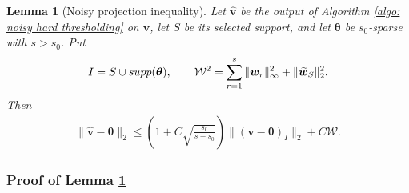 \documentclass[letterpaper,12pt]{article}
\numberwithin{equation}{section}
\theoremstyle{plain}
\numberwithin{Theorem}{section}
\numberwithin{proposition}{section}
\newtheorem{Lemma}{Lemma}
\numberwithin{Lemma}{section}
{
	\theoremstyle{definition}
	\newtheorem{Definition}{Definition}
	\newtheorem{example}{Example}
	\numberwithin{example}{section}
	\newtheorem{fact}{Fact}
	\numberwithin{fact}{section}
	\newtheorem{remark}{Remark}
}
\newcommand{\1}{\mathbbm{1}}
\def\supp{{\rm supp}}
\begin{document}
\begin{Lemma}[Noisy projection inequality]\label{lm: repaired noisy projection}
Let $\widehat{\bm v}$ be the output of Algorithm \ref{algo: noisy hard thresholding} on $\bm v$, let $S$ be its selected support, and let $\bm\theta$ be $s_0$-sparse with $s>s_0$.  Put
\begin{align*}
    I=S\cup\supp(\bm\theta),\qquad
    \mathcal W^2=\sum_{r=1}^s\|\bm w_r\|_\infty^2+
    \|\widetilde{\bm w}_S\|_2^2.
\end{align*}
Then
\begin{align}
    \|\widehat{\bm v}-\bm\theta\|_2
    \leq
    \left(1+C\sqrt{\frac{s_0}{s-s_0}}\right)
    \|(\bm v-\bm\theta)_I\|_2+C\mathcal W.                  \label{eq: repaired noisy projection}
\end{align}
\end{Lemma}

\subsubsection{Proof of Lemma \ref{lm: repaired noisy projection}}
\end{document}
